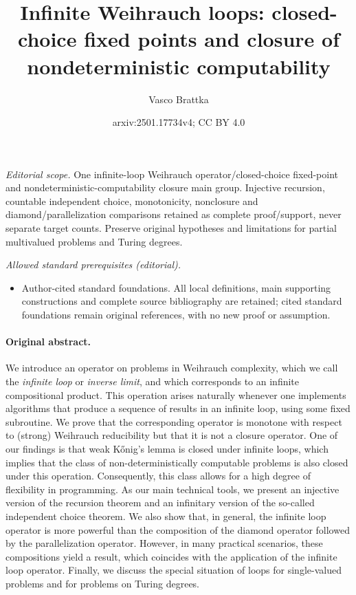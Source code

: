 \documentclass[11pt,a4paper]{amsart}
\title{Infinite Weihrauch loops: closed-choice fixed points and closure of nondeterministic computability}
\author{Vasco Brattka}
\date{arxiv:2501.17734v4; CC BY 4.0}
\theoremstyle{plain}
\theoremstyle{definition}
\theoremstyle{defC}
\theoremstyle{thmC}
\theoremstyle{plain}
\numberwithin{equation}{section}
\begin{document}
\maketitle
\noindent\textit{Editorial scope.} One infinite-loop Weihrauch operator/closed-choice fixed-point and nondeterministic-computability closure main group. Injective recursion, countable independent choice, monotonicity, nonclosure and diamond/parallelization comparisons retained as complete proof/support, never separate target counts. Preserve original hypotheses and limitations for partial multivalued problems and Turing degrees.\par\medskip
\noindent\textit{Allowed standard prerequisites (editorial).}\begin{itemize}
\item Author-cited standard foundations. All local definitions, main supporting constructions and complete source bibliography are retained; cited standard foundations remain original references, with no new proof or assumption.
\end{itemize}\medskip
\paragraph{Original abstract.} 
We introduce an operator on problems in Weihrauch complexity, which we call the {\em infinite loop} or {\em inverse limit}, and which
 corresponds to an infinite compositional product.
This operation arises naturally whenever one implements algorithms that produce a sequence of results 
in an infinite loop, using some fixed subroutine.
We prove that the corresponding operator is monotone with respect to (strong) Weihrauch reducibility but that
it is not a closure operator. 
One of our findings is that weak K\H{o}nig's lemma is closed under infinite loops, which implies that the
class of non-deterministically computable problems is also closed under this operation.
Consequently, this class allows for a high degree of flexibility in programming.
As our main technical tools, we present an injective version of the recursion theorem
and an infinitary version of the so-called independent choice theorem.
We also show that, in general, the infinite loop operator is more powerful than the composition of 
 the diamond operator followed by the parallelization operator. However,  in many practical scenarios,
these compositions yield a result, which coincides with the application of the infinite loop operator.
Finally, we discuss the special situation of loops for single-valued problems and for problems on Turing degrees.
\end{document}
